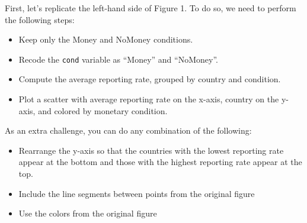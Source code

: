 \documentclass[12pt,halfline,a4paper,]{ouparticle}
\providecommand{\tightlist}{%
  \setlength{\itemsep}{0pt}\setlength{\parskip}{0pt}}
\begin{document}
First, let's replicate the left-hand side of Figure 1. To do so, we need
to perform the following steps:

\begin{itemize}
\tightlist
\item
  Keep only the Money and NoMoney conditions.
\item
  Recode the \texttt{cond} variable as ``Money'' and ``NoMoney''.
\item
  Compute the average reporting rate, grouped by country and condition.
\item
  Plot a scatter with average reporting rate on the x-axis, country on
  the y-axis, and colored by monetary condition.
\end{itemize}

As an extra challenge, you can do any combination of the following:

\begin{itemize}
\tightlist
\item
  Rearrange the y-axis so that the countries with the lowest reporting
  rate appear at the bottom and those with the highest reporting rate
  appear at the top.
\item
  Include the line segments between points from the original figure
\item
  Use the colors from the original figure
\end{itemize}
\end{document}
